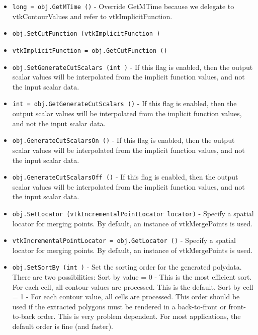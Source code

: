 \begin{itemize}
\item  \verb|long = obj.GetMTime ()| -  Override GetMTime because we delegate to vtkContourValues and refer to
 vtkImplicitFunction.

\item  \verb|obj.SetCutFunction (vtkImplicitFunction )|

\item  \verb|vtkImplicitFunction = obj.GetCutFunction ()|

\item  \verb|obj.SetGenerateCutScalars (int )| -  If this flag is enabled, then the output scalar values will be
 interpolated from the implicit function values, and not the input scalar
 data.

\item  \verb|int = obj.GetGenerateCutScalars ()| -  If this flag is enabled, then the output scalar values will be
 interpolated from the implicit function values, and not the input scalar
 data.

\item  \verb|obj.GenerateCutScalarsOn ()| -  If this flag is enabled, then the output scalar values will be
 interpolated from the implicit function values, and not the input scalar
 data.

\item  \verb|obj.GenerateCutScalarsOff ()| -  If this flag is enabled, then the output scalar values will be
 interpolated from the implicit function values, and not the input scalar
 data.

\item  \verb|obj.SetLocator (vtkIncrementalPointLocator locator)| -  Specify a spatial locator for merging points. By default, 
 an instance of vtkMergePoints is used.

\item  \verb|vtkIncrementalPointLocator = obj.GetLocator ()| -  Specify a spatial locator for merging points. By default, 
 an instance of vtkMergePoints is used.

\item  \verb|obj.SetSortBy (int )| -  Set the sorting order for the generated polydata. There are two
 possibilities:
   Sort by value = 0 - This is the most efficient sort. For each cell,
      all contour values are processed. This is the default.
   Sort by cell = 1 - For each contour value, all cells are processed.
      This order should be used if the extracted polygons must be rendered
      in a back-to-front or front-to-back order. This is very problem 
      dependent.
 For most applications, the default order is fine (and faster).


\end{itemize}
